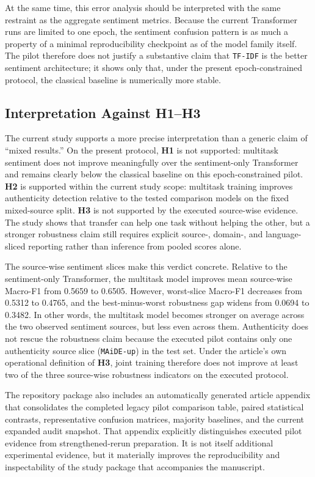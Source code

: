 \documentclass[12pt,a4paper]{article}
\begin{document}
At the same time, this error analysis should be interpreted with the same restraint as the aggregate sentiment metrics. Because the current Transformer runs are limited to one epoch, the sentiment confusion pattern is as much a property of a minimal reproducibility checkpoint as of the model family itself. The pilot therefore does not justify a substantive claim that \texttt{TF-IDF} is the better sentiment architecture; it shows only that, under the present epoch-constrained protocol, the classical baseline is numerically more stable.

\subsection{Interpretation Against H1--H3}

The current study supports a more precise interpretation than a generic claim of ``mixed results.'' On the present protocol, \textbf{H1} is not supported: multitask sentiment does not improve meaningfully over the sentiment-only Transformer and remains clearly below the classical baseline on this epoch-constrained pilot. \textbf{H2} is supported within the current study scope: multitask training improves authenticity detection relative to the tested comparison models on the fixed mixed-source split. \textbf{H3} is not supported by the executed source-wise evidence. The study shows that transfer can help one task without helping the other, but a stronger robustness claim still requires explicit source-, domain-, and language-sliced reporting rather than inference from pooled scores alone.

The source-wise sentiment slices make this verdict concrete. Relative to the sentiment-only Transformer, the multitask model improves mean source-wise Macro-F1 from 0.5659 to 0.6505. However, worst-slice Macro-F1 decreases from 0.5312 to 0.4765, and the best-minus-worst robustness gap widens from 0.0694 to 0.3482. In other words, the multitask model becomes stronger on average across the two observed sentiment sources, but less even across them. Authenticity does not rescue the robustness claim because the executed pilot contains only one authenticity source slice (\texttt{MAiDE-up}) in the test set. Under the article's own operational definition of \textbf{H3}, joint training therefore does not improve at least two of the three source-wise robustness indicators on the executed protocol.

The repository package also includes an automatically generated article appendix that consolidates the completed legacy pilot comparison table, paired statistical contrasts, representative confusion matrices, majority baselines, and the current expanded audit snapshot. That appendix explicitly distinguishes executed pilot evidence from strengthened-rerun preparation. It is not itself additional experimental evidence, but it materially improves the reproducibility and inspectability of the study package that accompanies the manuscript.
\end{document}
